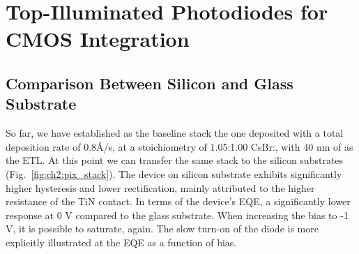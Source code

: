\chapter{Top-Illuminated Photodiodes for CMOS Integration}\label{ch:top_illuminated}

\section{Comparison Between Silicon and Glass Substrate}

So far, we have established as the baseline stack the one deposited with a total deposition rate of 0.8{\AA}/s, at a stoichiometry of 1.05:1.00 CsBr:, with 40 nm of  as the ETL. At this point we can transfer the same stack to the silicon substrates (Fig.~\ref{fig:ch2:pix_stack}). 
The device on silicon substrate exhibits significantly higher hysteresis and lower rectification, mainly attributed to the higher resistance of the TiN contact. In terms of the device's EQE, a significantly lower response at 0 V compared to the glass substrate. When increasing the bias to -1 V, it is possible to saturate, again. The slow turn-on of the diode is more explicitly illustrated at the EQE as a function of bias. 




